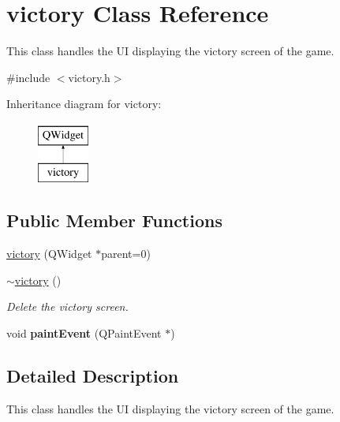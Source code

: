 \hypertarget{classvictory}{}\section{victory Class Reference}
\label{classvictory}


This class handles the UI displaying the victory screen of the game.  




{\ttfamily \#include $<$victory.\+h$>$}

Inheritance diagram for victory\+:\begin{figure}[H]
\begin{center}
\leavevmode
\includegraphics[height=2.000000cm]{classvictory}
\end{center}
\end{figure}
\subsection*{Public Member Functions}
\begin{DoxyCompactItemize}
\item 
\hyperlink{classvictory_a7d68234bd5e40dc9879caca6c2cdd4b3}{victory} (Q\+Widget $\ast$parent=0)
\item 
\hyperlink{classvictory_a6384ce7d94b46b7d07e8d870f939a863}{$\sim$victory} ()\hypertarget{classvictory_a6384ce7d94b46b7d07e8d870f939a863}{}\label{classvictory_a6384ce7d94b46b7d07e8d870f939a863}

\begin{DoxyCompactList}\small\item\em Delete the victory screen. \end{DoxyCompactList}\item 
void {\bfseries paint\+Event} (Q\+Paint\+Event $\ast$)\hypertarget{classvictory_a95c8578693a125725cf4d64694436eed}{}\label{classvictory_a95c8578693a125725cf4d64694436eed}

\end{DoxyCompactItemize}


\subsection{Detailed Description}
This class handles the UI displaying the victory screen of the game. 


